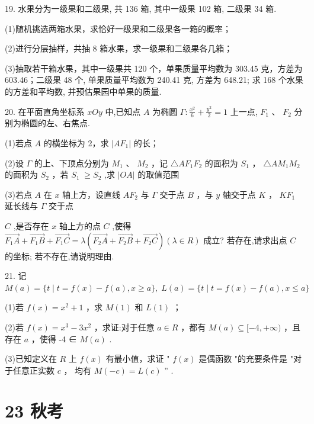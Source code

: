 \documentclass[10pt]{article}
\begin{document}
19. 水果分为一级果和二级果, 共 136 箱, 其中一级果 102 箱, 二级果 34 箱.

(1)随机挑选两箱水果，求恰好一级果和二级果各一箱的概率；

(2)进行分层抽样，共抽 8 箱水果，求一级果和二级果各几箱；

(3)抽取若干箱水果，其中一级果共 120 个，单果质量平均数为 303.45 克，方差为 603.46；二级果 48 个, 单果质量平均数为 240.41 克, 方差为 648.21; 求 168 个水果的方差和平均数, 并预估果园中单果的质量.

20. 在平面直角坐标系 \({xOy}\) 中,已知点 \(A\) 为椭圆 \(\Gamma  : \frac{{x}^{2}}{6} + \frac{{y}^{2}}{2} = 1\) 上一点, \({F}_{1}\text{ 、 }{F}_{2}\) 分别为椭圆的左、右焦点.

(1)若点 \(A\) 的横坐标为 2，求 \(\left| {A{F}_{1}}\right|\) 的长；

(2)设 \(\Gamma\) 的上、下顶点分别为 \({M}_{1}\) 、 \({M}_{2}\) ，记 \(\bigtriangleup  A{F}_{1}{F}_{2}\) 的面积为 \({S}_{1}\) ， \(\bigtriangleup  A{M}_{1}{M}_{2}\) 的面积为 \({S}_{2}\) ，若 \({S}_{1} \; \geq  {S}_{2}\) ,求 \(\left| {OA}\right|\) 的取值范围

(3)若点 \(A\) 在 \(x\) 轴上方，设直线 \(A{F}_{2}\) 与 \(\Gamma\) 交于点 \(B\) ，与 \(y\) 轴交于点 \(K\) ， \(K{F}_{1}\) 延长线与 \(\Gamma\) 交于点

\(C\) ,是否存在 \(x\) 轴上方的点 \(C\) ,使得 \(\overrightarrow{{F}_{1}A} + \overrightarrow{{F}_{1}B} + \overrightarrow{{F}_{1}C} = \lambda \left( {\overrightarrow{{F}_{2}A} + \overrightarrow{{F}_{2}B} + \overrightarrow{{F}_{2}C}}\right) \left( {\lambda  \in  R}\right)\) 成立? 若存在,请求出点 \(C\) 的坐标; 若不存在,请说明理由.

21. 记 \(M\left( a\right)  = \{ t \mid  t = f\left( x\right)  - f\left( a\right) ,x \geq  a\} ,\;L\left( a\right)  = \{ t \mid  t = f\left( x\right)  - f\left( a\right) ,x \leq  a\}\)

(1)若 \(f\left( x\right)  = {x}^{2} + 1\) ，求 \(M\left( 1\right)\) 和 \(L\left( 1\right)\) ；

(2)若 \(f\left( x\right)  = {x}^{3} - 3{x}^{2}\) ，求证:对于任意 \(a \in  R\) ，都有 \(M\left( a\right)  \subseteq  \lbrack  - 4, + \infty )\) ，且存在 \(a\) ，使得 -4 ∈ \(M\left( a\right)\) .

(3)已知定义在 \(R\) 上 \(f\left( x\right)\) 有最小值，求证 " \(f\left( x\right)\) 是偶函数 "的充要条件是 "对于任意正实数 \(c\) ， 均有 \(M\left( {-c}\right)  = L\left( c\right)\) ” .

\section*{23 秋考}
\end{document}
